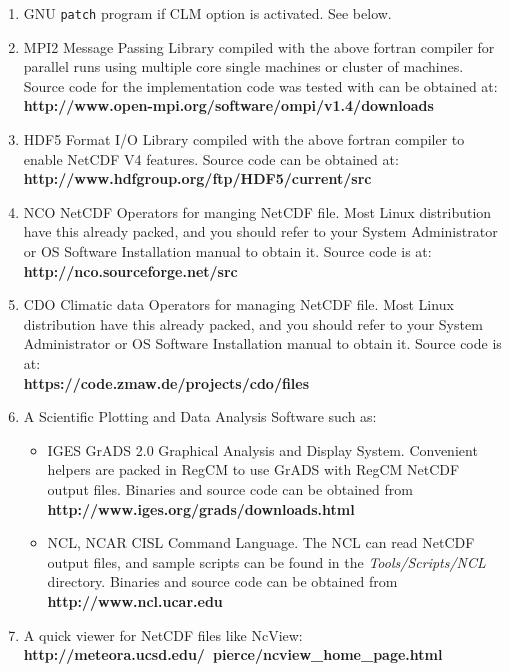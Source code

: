 \begin{enumerate}
\item GNU \verb=patch= program if CLM option is activated. See below.
\item MPI2 Message Passing Library compiled with the above fortran compiler
for parallel runs using multiple core single machines or cluster of machines.
Source code for the implementation code was tested with can be obtained at: \\
{\bf http://www.open-mpi.org/software/ompi/v1.4/downloads}
\item HDF5 Format I/O Library compiled with the above fortran compiler to
enable NetCDF V4 features. Source code can be obtained at: \\
{\bf http://www.hdfgroup.org/ftp/HDF5/current/src}
\item NCO NetCDF Operators for manging NetCDF file. Most Linux distribution
have this already packed, and you should refer to your System Administrator or
OS Software Installation manual to obtain it. Source code is at: \\
{\bf http://nco.sourceforge.net/src}
\item CDO Climatic data Operators for managing NetCDF file. Most Linux
distribution have this already packed, and you should refer to your System
Administrator or OS Software Installation manual to obtain it.
Source code is at: \\
{\bf https://code.zmaw.de/projects/cdo/files}
\item A Scientific Plotting and Data Analysis Software such as:
\begin{itemize}
\item IGES GrADS 2.0 Graphical Analysis and Display System. Convenient helpers
are packed in RegCM to use GrADS with RegCM NetCDF output files.
Binaries and source code can be obtained from \\
{\bf http://www.iges.org/grads/downloads.html}
\item NCL, NCAR CISL Command Language. The NCL can read NetCDF output files, and
sample scripts can be found in the {\em Tools/Scripts/NCL} directory.
Binaries and source code can be obtained from \\
{\bf http://www.ncl.ucar.edu}
\end{itemize}
\item A quick viewer for NetCDF files like NcView: \\
{\bf http://meteora.ucsd.edu/~pierce/ncview\_home\_page.html}
\end{enumerate}

